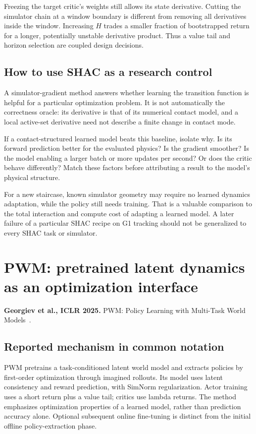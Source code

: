 Freezing the target critic's weights still allows its state derivative. Cutting
the simulator chain at a window boundary is different from removing all
derivatives inside the window. Increasing $H$ trades a smaller fraction of
bootstrapped return for a longer, potentially unstable derivative product.
Thus a value tail and horizon selection are coupled design decisions.

\subsection{How to use SHAC as a research control}
A simulator-gradient method answers whether learning the transition function
is helpful for a particular optimization problem. It is not automatically the
correctness oracle: its derivative is that of its numerical contact model,
and a local active-set derivative need not describe a finite change in contact mode.

If a contact-structured learned model beats this baseline, isolate why. Is its
forward prediction better for the evaluated physics? Is the gradient smoother?
Is the model enabling a larger batch or more updates per second? Or does the
critic behave differently? Match these factors before attributing a result to
the model's physical structure.

For a new staircase, known simulator geometry may require no learned dynamics
adaptation, while the policy still needs training. That is a valuable comparison
to the total interaction and compute cost of adapting a learned model. A later
failure of a particular SHAC recipe on G1 tracking should not be generalized
to every SHAC task or simulator.

\section{PWM: pretrained latent dynamics as an optimization interface}\label{sec:pwm}
\textbf{Georgiev et al., ICLR 2025.} PWM: Policy Learning with Multi-Task
World Models~\cite{pwm}.

\subsection{Reported mechanism in common notation}
PWM pretrains a task-conditioned latent world model and extracts policies by
first-order optimization through imagined rollouts. Its model uses latent
consistency and reward prediction, with SimNorm regularization. Actor training
uses a short return plus a value tail; critics use lambda returns. The method
emphasizes optimization properties of a learned model, rather than prediction
accuracy alone. Optional subsequent online fine-tuning is distinct from the
initial offline policy-extraction phase.


